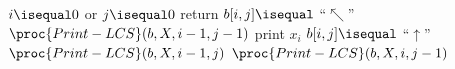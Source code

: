 \begin{codebox}
\li \If $i \isequal 0$ or $j \isequal 0$ \Then
\li return \End
\li \If $b[i,j] \isequal$ ``$\nwarrow$'' \Then
\li $\proc{Print-LCS}(b,X,i-1,j-1)$
\li print $x_i$
\li \ElseIf $b[i,j] \isequal$ ``$\uparrow$'' \Then
\li $\proc{Print-LCS}(b,X,i-1,j)$
\li \ElseNoIf $\proc{Print-LCS}(b,X,i,j-1)$ \End
\end{codebox}